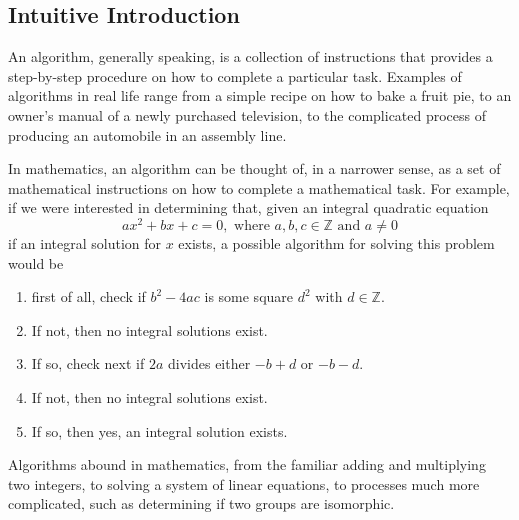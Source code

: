 \documentclass[12pt]{article}
\begin{document}
\subsection*{Intuitive Introduction}

An algorithm, generally speaking, is a collection of instructions that provides a step-by-step procedure on how to complete a particular task.  Examples of algorithms in real life range from a simple recipe on how to bake a fruit pie, to an owner's manual of a newly purchased television, to the complicated process of producing an automobile in an assembly line.  

In mathematics, an algorithm can be thought of, in a narrower sense, as a set of mathematical instructions on how to complete a mathematical task.  For example, if we were interested in determining that, given an integral quadratic equation 
$$ax^2+bx+c=0,\mbox{ where }a,b,c\in\mathbb{Z}\mbox{ and }a\ne 0$$
if an integral solution for $x$ exists, a possible algorithm for solving this problem would be
\begin{enumerate}
\item
first of all, check if $b^2-4ac$ is some square $d^2$ with $d\in \mathbb{Z}$.  
\item
If not, then no integral solutions exist.  
\item
If so, check next if $2a$ divides either $-b+d$ or $-b-d$.  
\item 
If not, then no integral solutions exist.  
\item
If so, then yes, an integral solution exists.  
\end{enumerate}
Algorithms abound in mathematics, from the familiar adding and multiplying two integers, to solving a system of linear equations, to processes much more complicated, such as determining if two groups are isomorphic.
\end{document}
